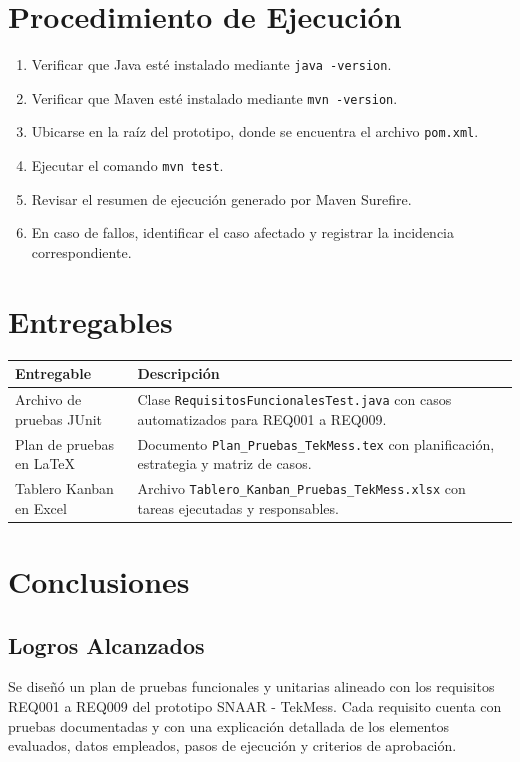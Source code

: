 \documentclass[12pt,a4paper]{article}
\begin{document}
\section{Procedimiento de Ejecución}

\begin{enumerate}[leftmargin=*]
    \item Verificar que Java esté instalado mediante \texttt{java -version}.
    \item Verificar que Maven esté instalado mediante \texttt{mvn -version}.
    \item Ubicarse en la raíz del prototipo, donde se encuentra el archivo \texttt{pom.xml}.
    \item Ejecutar el comando \texttt{mvn test}.
    \item Revisar el resumen de ejecución generado por Maven Surefire.
    \item En caso de fallos, identificar el caso afectado y registrar la incidencia correspondiente.
\end{enumerate}

\section{Entregables}

\begin{longtable}{|p{5cm}|p{9cm}|}
\hline
\rowcolor{grisClaro}
\textbf{Entregable} & \textbf{Descripción} \\
\hline
Archivo de pruebas JUnit & Clase \texttt{RequisitosFuncionalesTest.java} con casos automatizados para REQ001 a REQ009. \\
\hline
Plan de pruebas en LaTeX & Documento \texttt{Plan\_Pruebas\_TekMess.tex} con planificación, estrategia y matriz de casos. \\
\hline
Tablero Kanban en Excel & Archivo \texttt{Tablero\_Kanban\_Pruebas\_TekMess.xlsx} con tareas ejecutadas y responsables. \\
\hline
\end{longtable}

\section{Conclusiones}

\subsection{Logros Alcanzados}

Se diseñó un plan de pruebas funcionales y unitarias alineado con los requisitos REQ001 a REQ009 del prototipo SNAAR - TekMess. Cada requisito cuenta con pruebas documentadas y con una explicación detallada de los elementos evaluados, datos empleados, pasos de ejecución y criterios de aprobación.
\end{document}
